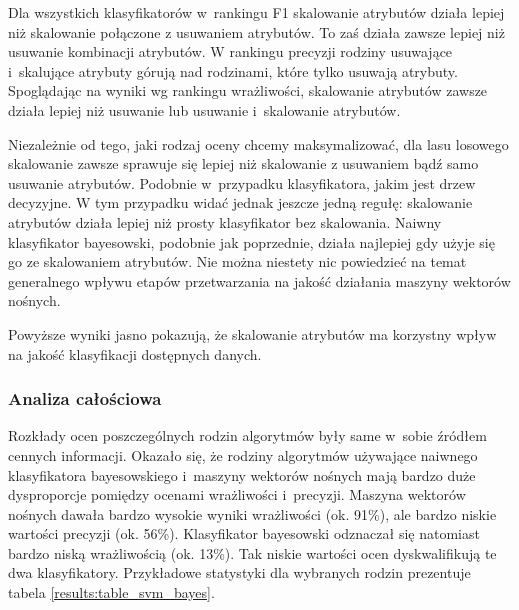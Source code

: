 \documentclass[../thesis.tex]{subfiles}
\begin{document}
Dla wszystkich klasyfikatorów w~rankingu F1 skalowanie atrybutów działa lepiej niż skalowanie połączone z usuwaniem atrybutów. To zaś działa zawsze lepiej niż usuwanie kombinacji atrybutów. W rankingu precyzji rodziny usuwające i~skalujące atrybuty górują nad rodzinami, które tylko usuwają atrybuty. Spoglądając na wyniki wg rankingu wrażliwości, skalowanie atrybutów zawsze działa lepiej niż usuwanie lub usuwanie i~skalowanie atrybutów.

Niezależnie od tego, jaki rodzaj oceny chcemy maksymalizować, dla lasu losowego skalowanie zawsze sprawuje się lepiej niż skalowanie z usuwaniem bądź samo usuwanie atrybutów. Podobnie w~przypadku klasyfikatora, jakim jest drzew decyzyjne. W tym przypadku widać jednak jeszcze jedną regułę: skalowanie atrybutów działa lepiej niż prosty klasyfikator bez skalowania. Naiwny klasyfikator bayesowski, podobnie jak poprzednie, działa najlepiej gdy użyje się go ze skalowaniem atrybutów. Nie można niestety nic powiedzieć na temat generalnego wpływu etapów przetwarzania na jakość działania maszyny wektorów nośnych.

Powyższe wyniki jasno pokazują, że skalowanie atrybutów ma korzystny wpływ na jakość klasyfikacji dostępnych danych.

\subsubsection{Analiza całościowa}

Rozkłady ocen poszczególnych rodzin algorytmów były same w~sobie źródłem cennych informacji. Okazało się, że rodziny algorytmów używające naiwnego klasyfikatora bayesowskiego i~maszyny wektorów nośnych mają bardzo duże dysproporcje pomiędzy ocenami wrażliwości i~precyzji. Maszyna wektorów nośnych dawała bardzo wysokie wyniki wrażliwości (ok. 91\%), ale bardzo niskie wartości precyzji (ok. 56\%). Klasyfikator bayesowski odznaczał się natomiast bardzo niską wrażliwością (ok. 13\%). Tak niskie wartości ocen dyskwalifikują te dwa klasyfikatory. Przykładowe statystyki dla wybranych rodzin prezentuje tabela \ref{results:table_svm_bayes}.
\end{document}
